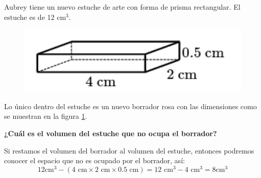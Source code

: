 Aubrey tiene un nuevo estuche de arte con forma de prisma rectangular. El estuche es de 12 cm$^3$.

\begin{minipage}{0.3\linewidth}
    \begin{figure}[H]
        \begin{center}
            \includegraphics[width=1\textwidth]{../images/vol_area_03}
        \end{center}
        \caption{}
        \label{fig:vol_area_03}
    \end{figure}
\end{minipage}\hfill
\begin{minipage}{0.7\linewidth}
    Lo único dentro del estuche es un nuevo borrador rosa con las dimensiones
    como se muestran en la figura \ref{fig:vol_area_03}.

    \textbf{¿Cuál es el volumen del estuche que no ocupa el borrador?}\\

    \begin{solutionbox}{2.5cm}
        Si restamos el volumen del borrador  al volumen del estuche, entonces podremos conocer el espacio que no es ocupado por el borrador, así:
        \[12 \text{cm}^3 - \left(4 \text{ cm} \times 2 \text{ cm} \times 0.5 \text{ cm}\right)=12 \text{ cm}^3 - 4 \text{ cm}^3 = 8 \text{cm}^3   \]
    \end{solutionbox}
\end{minipage}